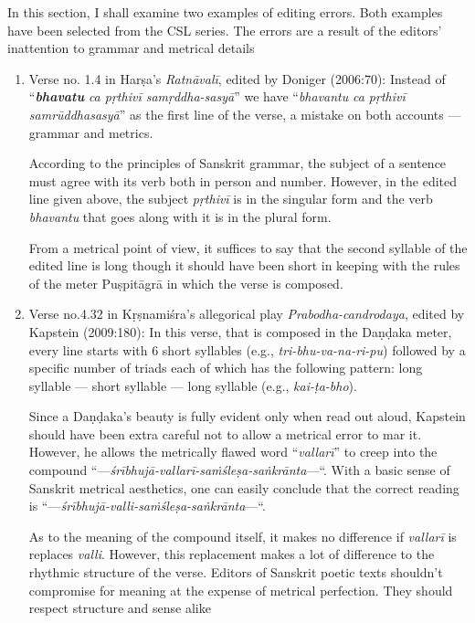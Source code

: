 In this section, I shall examine two examples of editing errors. Both examples have been selected from the CSL series. The errors are a result of the editors’ inattention to grammar and metrical details
\begin{enumerate}
\item Verse no. 1.4 in Harṣa’s \textsl{Ratnāvalī},
 edited by Doniger (2006:70): Instead of “{\sl\bfseries bhavatu} \textsl{ca pṛthivī samṛddha-sasyā}” we have “\textsl{bhavantu} \textsl{ca pṛthivī samrūddhasasyā}” as the first line of the verse, a mistake on both accounts --- grammar and metrics. 

According to the principles of Sanskrit grammar, the subject of a sentence must agree with its verb both in person and number. However, in the edited line given above, the subject \textsl{pṛthivī} is in the singular form and the verb \textsl{bhavantu} that goes along with it is in the plural form. 

From a metrical point of view, it suffices to say that the second syllable of the edited line is long though it should have been short in keeping with the rules of the meter Puṣpitāgrā in which the verse is composed.  

\item Verse no.\@ 4.32 in Kṛṣnamiśra’s allegorical play \textsl{Prabodha-candrodaya}, edited by Kapstein (2009:180):  In this verse, that is composed in the Daṇḍaka meter, every line starts with 6 short syllables (e.g., \textsl{tri-bhu-va-na-ri-pu}) followed by a specific number of triads each of which has the following pattern: long syllable --- short syllable --- long syllable (e.g., \textsl{kai-ṭa-bho}). 

Since a Daṇḍaka’s beauty is fully evident only when read out aloud, Kapstein should have been extra careful not to allow a metrical error to mar it. However, he allows the metrically flawed word “\textsl{vallarī}” to creep into the compound “---\textsl{śrībhujā-}\textsl{vallarī-}\textsl{saṁśleṣa-saṅkrānta}—“. With a basic sense of Sanskrit metrical aesthetics, one can easily conclude that the correct reading is “---\textsl{śrībhujā-}\textsl{valli-}\textsl{saṁśleṣa-saṅkrānta}—“. 

As to the meaning of the compound itself, it makes no difference if \textsl{vallarī} is replaces \textsl{valli}. However, this replacement makes a lot of difference to the rhythmic structure of the verse. Editors of Sanskrit poetic texts shouldn’t compromise for meaning at the expense of metrical perfection. They should respect structure and sense alike
\end{enumerate}
